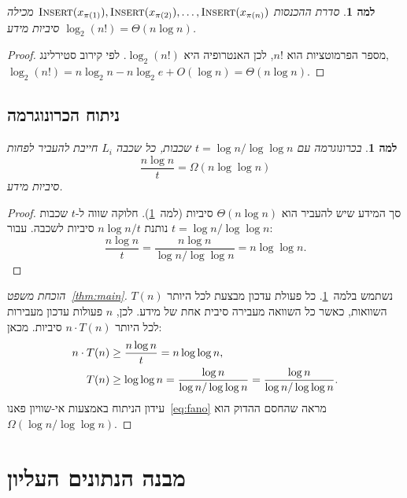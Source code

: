 \documentclass[12pt,a4paper]{article}
\theoremstyle{plain}
\newtheorem{lemma}[theorem]{למה}
\theoremstyle{definition}
\theoremstyle{remark}
\begin{document}
\begin{lemma}
\label{lem:info_content}
סדרת ההכנסות $\textsc{Insert}(x_{\pi(1)}), \textsc{Insert}(x_{\pi(2)}),
\ldots, \textsc{Insert}(x_{\pi(n)})$ מכילה $\log_2(n!) = \Theta(n \log n)$
סיביות מידע.
\end{lemma}

\begin{proof}
מספר הפרמוטציות הוא $n!$, לכן האנטרופיה היא $\log_2(n!)$.
לפי קירוב סטירלינג, $\log_2(n!) = n \log_2 n - n \log_2 e + O(\log n) = \Theta(n \log n)$.
\end{proof}

\subsection{ניתוח הכרונוגרמה}

\begin{lemma}
\label{lem:chronogram_layers}
בכרונוגרמה עם $t = \log n / \log \log n$ שכבות, כל שכבה $L_i$
חייבת להעביר לפחות
\[
\frac{n \log n}{t} = \Omega(n \log \log n)
\]
סיביות מידע.
\end{lemma}

\begin{proof}
סך המידע שיש להעביר הוא $\Theta(n \log n)$ סיביות
(למה~\ref{lem:info_content}). חלוקה שווה ל-$t$ שכבות נותנת
$n \log n / t$ סיביות לשכבה. עבור $t = \log n / \log \log n$:
\[
\frac{n \log n}{t} = \frac{n \log n}{\log n / \log \log n} = n \log \log n.
\]
\end{proof}

\begin{proof}[הוכחת משפט~\ref{thm:main}]
נשתמש בלמה~\ref{lem:chronogram_layers}. כל פעולת עדכון מבצעת
לכל היותר $T(n)$ השוואות, כאשר כל השוואה מעבירה סיבית אחת
של מידע. לכן, $n$ פעולות עדכון מעבירות לכל היותר $n \cdot T(n)$
סיביות. מכאן:
\begin{align}
\label{eq:main_proof}
n \cdot T(n) &\geq \frac{n \log n}{t} = n \log \log n, \notag \\
T(n) &\geq \log \log n = \frac{\log n}{\log n / \log \log n} = \frac{\log n}{\log n / \log \log n}.
\end{align}
עידון הניתוח באמצעות אי-שוויון פאנו~\eqref{eq:fano} מראה
שהחסם ההדוק הוא $\Omega(\log n / \log \log n)$.
\end{proof}

\section{מבנה הנתונים העליון}
\label{sec:upper}
\end{document}
